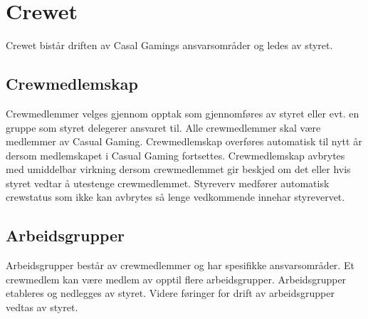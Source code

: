 \chapter{Crewet}
Crewet bistår driften av Casal Gamings ansvarsområder og ledes av styret.

\section{Crewmedlemskap}
Crewmedlemmer velges gjennom opptak som gjennomføres av styret eller evt. en gruppe som styret delegerer ansvaret til. Alle crewmedlemmer skal være medlemmer av Casual Gaming. Crewmedlemskap overføres automatisk til nytt år dersom medlemskapet i Casual Gaming fortsettes. Crewmedlemskap avbrytes med umiddelbar virkning dersom crewmedlemmet gir beskjed om det eller hvis styret vedtar å utestenge crewmedlemmet. Styreverv medfører automatisk crewstatus som ikke kan avbrytes så lenge vedkommende innehar styrevervet.

\section{Arbeidsgrupper}
Arbeidsgrupper består av crewmedlemmer og har spesifikke ansvarsområder. Et crewmedlem kan være medlem av opptil flere arbeidsgrupper. Arbeidsgrupper etableres og nedlegges av styret. Videre føringer for drift av arbeidsgrupper vedtas av styret.
